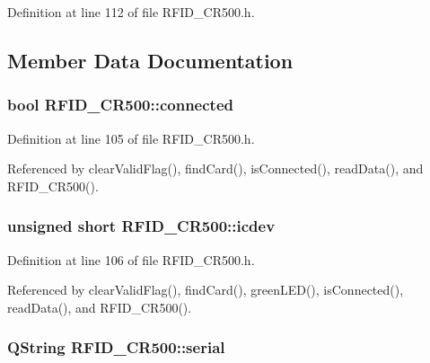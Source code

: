Definition at line 112 of file RFID\_\-CR500.h.

\subsection{Member Data Documentation}
\hypertarget{class_r_f_i_d___c_r500_40862a8ca6eeaf91bb5974f17641285a}{
\subsubsection[connected]{\setlength{\rightskip}{0pt plus 5cm}bool {\bf RFID\_\-CR500::connected}}}
\label{class_r_f_i_d___c_r500_40862a8ca6eeaf91bb5974f17641285a}




Definition at line 105 of file RFID\_\-CR500.h.

Referenced by clearValidFlag(), findCard(), isConnected(), readData(), and RFID\_\-CR500().\hypertarget{class_r_f_i_d___c_r500_db93e027f9415df3008e43478a9bdaed}{
\subsubsection[icdev]{\setlength{\rightskip}{0pt plus 5cm}unsigned short {\bf RFID\_\-CR500::icdev}}}
\label{class_r_f_i_d___c_r500_db93e027f9415df3008e43478a9bdaed}




Definition at line 106 of file RFID\_\-CR500.h.

Referenced by clearValidFlag(), findCard(), greenLED(), isConnected(), readData(), and RFID\_\-CR500().\hypertarget{class_r_f_i_d___c_r500_80434957a623b58350ddd0b0eea45133}{
\subsubsection[serial]{\setlength{\rightskip}{0pt plus 5cm}QString {\bf RFID\_\-CR500::serial}}}
\label{class_r_f_i_d___c_r500_80434957a623b58350ddd0b0eea45133}




